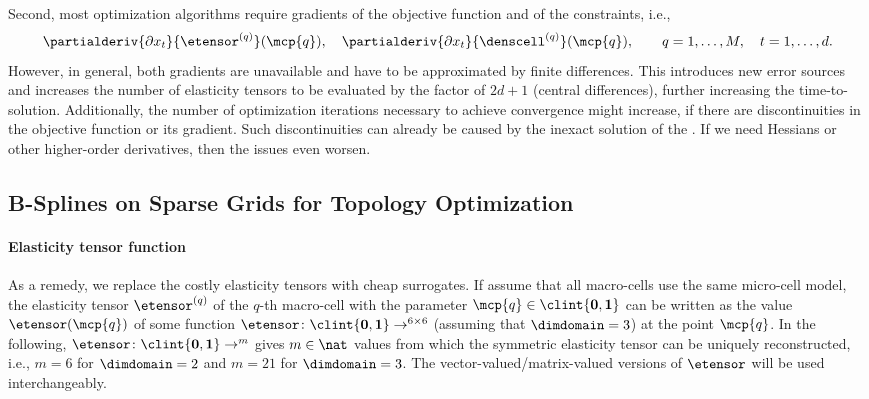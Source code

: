 Second, most optimization algorithms require gradients of the
objective function and of the constraints, i.e.,%
\begin{equation}
  \partialderiv{\partialdiff{} x_t}{\etensor^{(q)}}(\mcp{q}),\quad
  \partialderiv{\partialdiff{} x_t}{\denscell^{(q)}}(\mcp{q}),\qquad
  q = 1, \dotsc, M,\quad
  t = 1, \dotsc, d.
\end{equation}
However, in general, both gradients are unavailable and
have to be approximated by finite differences.
This introduces new error sources and
increases the number of elasticity tensors to be evaluated
by the factor of $2d + 1$ (central differences),
further increasing the time-to-solution.
Additionally, the number of optimization iterations necessary to
achieve convergence might increase,
if there are discontinuities in the objective function
or its gradient.
Such discontinuities can already be caused by the inexact solution of the \fem.
If we need Hessians or other higher-order derivatives,
then the issues even worsen.



\subsection{B-Splines on Sparse Grids for Topology Optimization}
\label{sec:622BSplines}

\paragraph{Elasticity tensor function}

As a remedy, we replace the costly elasticity tensors with cheap surrogates.
If assume that all macro-cells use the same micro-cell model,
the elasticity tensor $\etensor^{(q)}$ of the $q$-th macro-cell
with the parameter $\mcp{q} \in \clint{\*0, \*1}$
can be written as the value $\etensor(\mcp{q})$ of some function
$\etensor\colon \clint{\*0, \*1} \to \real^{6 \times 6}$
(assuming that $\dimdomain = 3$) at the point $\mcp{q}$.
In the following,
$\etensor\colon \clint{\*0, \*1} \to \real^m$
gives $m \in \nat$ values from which the symmetric elasticity tensor
can be uniquely reconstructed,
i.e., $m = 6$ for $\dimdomain = 2$ and $m = 21$ for $\dimdomain = 3$.
The vector-valued/matrix-valued versions of $\etensor$
will be used interchangeably.

